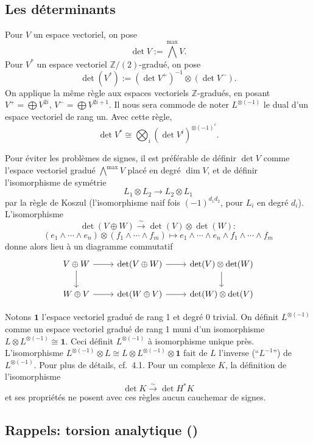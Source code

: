 \documentclass[12pt,a4paper]{article}
\theoremstyle{plain}
\theoremstyle{definition}
\newcommand{\ZZ}{\mathbb{Z}}
\begin{document}
\subsection{Les d\'eterminants}

Pour $V$ un espace vectoriel, on pose
\[
\det V := \bigwedge^{\max} V .
\]
Pour $V^*$ un espace vectoriel $\ZZ/(2)$-gradu\'e, on pose
\[
\det(V^*) := (\det V^+)^{-1} \otimes (\det V^-) .
\]
On applique la m\^eme r\`egle aux espaces vectoriels $\ZZ$-gradu\'es, en posant $V^+ =
\bigoplus V^{2i}$, $V^- = \bigoplus V^{2i+1}$. Il nous sera commode de noter $L^{\otimes(-1)}$ le dual d'un espace
vectoriel de rang un. Avec cette r\`egle,
\[
\det V^* \cong \bigotimes_i (\det V^i)^{\otimes (-1)^i} .
\]

Pour \'eviter les probl\`emes de signes, il est pr\'ef\'erable de d\'efinir $\det V$
comme l'espace vectoriel gradu\'e $\bigwedge^{\max} V$ plac\'e en degr\'e $\dim V$, et de d\'efinir
l'isomorphisme de sym\'etrie
\[
L_1 \otimes L_2 \to L_2 \otimes L_1
\]
par la r\`egle de Koszul (l'isomorphisme naif fois $(-1)^{d_1 d_2}$, pour $L_i$ en degr\'e
$d_i$). L'isomorphisme
\[
\det(V \oplus W) \xrightarrow{\sim} \det(V) \otimes \det(W):
\]
\[
(e_1 \wedge \cdots \wedge e_n) \otimes (f_1 \wedge \cdots \wedge f_m) \mapsto e_1 \wedge \cdots \wedge e_n \wedge f_1 \wedge \cdots \wedge f_m
\]
donne alors lieu \`a un diagramme commutatif
\[
\begin{tikzcd}
V \oplus W \arrow[r] \arrow[d] & \det(V \oplus W) \arrow[r] & \det(V) \otimes \det(W) \arrow[d] \\
W \oplus V \arrow[r] & \det(W \oplus V) \arrow[r] & \det(W) \otimes \det(V)
\end{tikzcd}
\]

Notons $\mathbf{1}$ l'espace vectoriel gradu\'e de rang 1 et degr\'e 0 trivial. On d\'efinit
$L^{\otimes(-1)}$ comme un espace vectoriel gradu\'e de rang 1 muni d'un isomorphisme $L \otimes L^{\otimes(-1)} \cong \mathbf{1}$. Ceci d\'efinit $L^{\otimes(-1)}$ \`a isomorphisme unique pr\`es. L'isomorphisme $L^{\otimes(-1)} \otimes L \cong L \otimes L^{\otimes(-1)} \otimes \mathbf{1}$ fait de $L$ l'inverse (``$L^{-1}$'') de $L^{\otimes(-1)}$. Pour plus de d\'etails,
cf.~4.1. Pour un complexe $K$, la d\'efinition de l'isomorphisme
\[
\det K \xrightarrow{\sim} \det H^*K
\]
et ses propri\'et\'es ne posent avec ces r\`egles aucun cauchemar de signes.

\subsection{Rappels: torsion analytique (\cite{14})}
\end{document}
